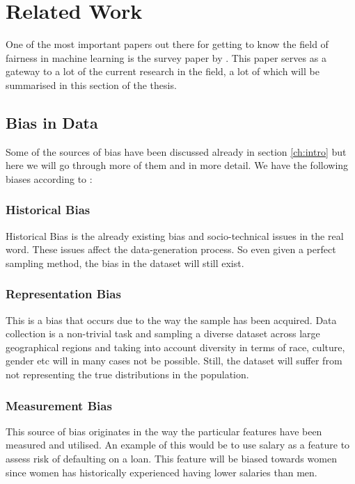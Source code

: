 
\chapter{Related Work}
\label{ch:related}

One of the most important papers out there for getting to know the field of fairness in machine learning is the survey paper by \citet{Mehrabi:2021:CSUR}. This paper serves as a gateway to a lot of the current research in the field, a lot of which will be summarised in this section of the thesis.

\section{Bias in Data}

Some of the sources of bias have been discussed already in section \ref{ch:intro} but here we will go through more of them and in more detail. We have the following biases according to \citet{Mehrabi:2021:CSUR}:

\subsection{Historical Bias}

Historical Bias is the already existing bias and socio-technical issues in the real word. These issues affect the data-generation process. So even given a perfect sampling method, the bias in the dataset will still exist. \cite{Suresh:2019:arXiv}

\subsection{Representation Bias}

This is a bias that occurs due to the way the sample has been acquired. \cite{Suresh:2019:arXiv} Data collection is a non-trivial task and sampling a diverse dataset across large geographical regions and taking into account diversity in terms of race, culture, gender etc will in many cases not be possible. Still, the dataset will suffer from not representing the true distributions in the population.

\subsection{Measurement Bias}

This source of bias originates in the way the particular features have been measured and utilised. \cite{Suresh:2019:arXiv} An example of this would be to use salary as a feature to assess risk of defaulting on a loan. This feature will be biased towards women since women has historically experienced having lower salaries than men.

